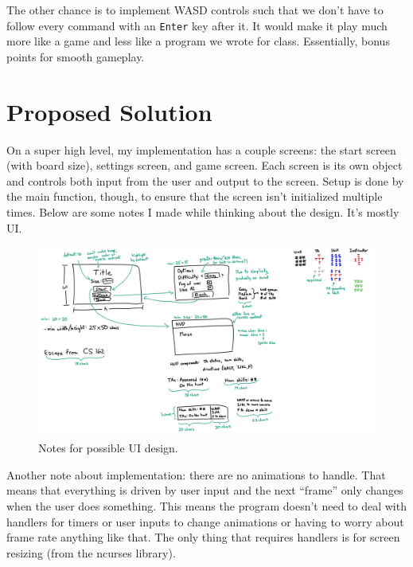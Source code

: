 \documentclass[11pt]{article} %
\begin{document}
The other chance is to implement WASD controls such that we don't have to follow every command with an \verb|Enter| key after it. It would make it play much more like a game and less like a program we wrote for class. Essentially, bonus points for smooth gameplay.

\section{Proposed Solution}
On a super high level, my implementation has a couple screens: the start screen (with board size), settings screen, and game screen. Each screen is its own object and controls both input from the user and output to the screen. Setup is done by the main function, though, to ensure that the screen isn't initialized multiple times. Below are some notes I made while thinking about the design. It's mostly UI.

\noindent
\begin{figure}[h]
	\centering
	\includegraphics[scale=1]{storyboard.png}
	\caption{Notes for possible UI design.}
\end{figure}

Another note about implementation: there are no animations to handle. That means that everything is driven by user input and the next ``frame'' only changes when the user does something. This means the program doesn't need to deal with handlers for timers or user inputs to change animations or having to worry about frame rate anything like that. The only thing that requires handlers is for screen resizing (from the ncurses library).
\end{document}
